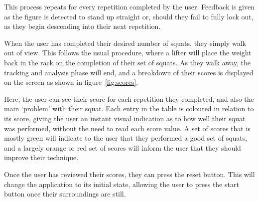 This process repeats for every repetition completed by the user. Feedback is given as the figure is detected to stand up straight or, should they fail to fully lock out, as they begin descending into their next repetition.

When the user has completed their desired number of squats, they simply walk out of view. This follows the usual procedure, where a lifter will place the weight back in the rack on the completion of their set of squats. As they walk away, the tracking and analysis phase will end, and a breakdown of their scores is displayed on the screen as shown in figure~\ref{fig:scores}.



Here, the user can see their score for each repetition they completed, and also the main `problem' with their squat. Each entry in the table is coloured in relation to its score, giving the user an instant visual indication as to how well their squat was performed, without the need to read each score value. A set of scores that is mostly green will indicate to the user that they performed a good set of squats, and a largely orange or red set of scores will inform the user that they should improve their technique.

Once the user has reviewed their scores, they can press the reset button. This will change the application to its initial state, allowing the user to press the start button once their surroundings are still.